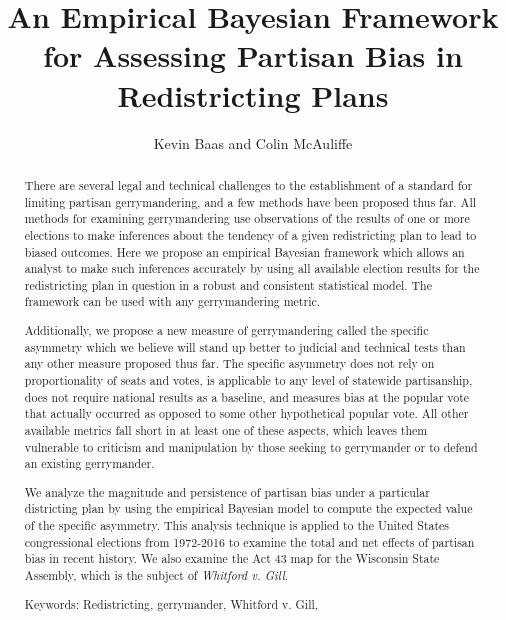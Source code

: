 \documentclass[preprint,12pt]{article}
\begin{document}
\title{An Empirical Bayesian Framework for Assessing Partisan Bias in Redistricting Plans}

\author{Kevin Baas and Colin McAuliffe}

\maketitle

\begin{abstract}
There are several legal and technical challenges to the establishment of a standard for limiting partisan gerrymandering, and a few methods have been proposed thus far.
All methods for examining gerrymandering use observations of the results of one or more elections to make inferences about the tendency of a given redistricting plan to lead to biased outcomes.  
Here we propose an empirical Bayesian framework which allows an analyst to make such inferences accurately by using all available election results for the redistricting plan in question in a robust and consistent statistical model.
The framework can be used with any gerrymandering metric.

Additionally, we propose a new measure of gerrymandering called the specific asymmetry which we believe will stand up better to judicial and technical tests than any other measure proposed thus far.
The specific asymmetry does not rely on proportionality of seats and votes, is applicable to any level of statewide partisanship, does not require national results as a baseline, and measures bias at the popular vote that actually occurred as opposed to some other hypothetical popular vote. 
All other available metrics fall short in at least one of these aspects, which leaves them vulnerable to criticism and manipulation by those seeking to gerrymander or to defend an existing gerrymander.

We analyze the magnitude and persistence of partisan bias under a particular districting plan by using the empirical Bayesian model to compute the expected value of the specific asymmetry.
This analysis technique is applied to the United States congressional elections from 1972-2016 to examine the total and net effects of partisan bias in recent history.
We also examine the Act 43 map for the Wisconsin State Assembly, which is the subject of \emph{Whitford v. Gill}.

Keywords: Redistricting, gerrymander, Whitford v. Gill, 

\end{abstract}
\end{document}
